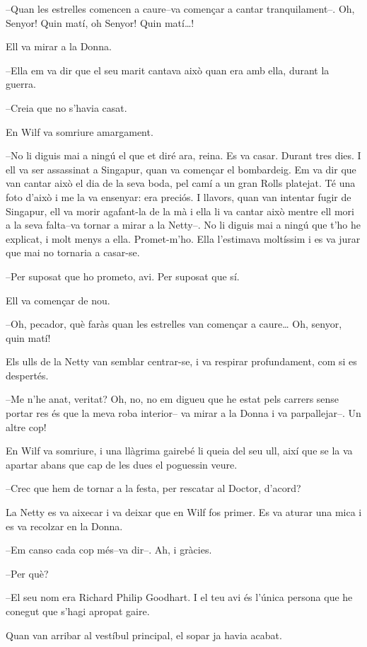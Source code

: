 --Quan les estrelles comencen a caure--va començar a cantar
tranquilament--. Oh, Senyor! Quin matí, oh Senyor! Quin matí\ldots{}!

Ell va mirar a la Donna.

--Ella em va dir que el seu marit cantava això quan era amb ella, durant
la guerra.

--Creia que no s'havia casat.

En Wilf va somriure amargament.

--No li diguis mai a ningú el que et diré ara, reina. Es va casar.
Durant tres dies. I ell va ser assassinat a Singapur, quan va començar
el bombardeig. Em va dir que van cantar això el dia de la seva boda, pel
camí a un gran Rolls platejat. Té una foto d'això i me la va ensenyar:
era preciós. I llavors, quan van intentar fugir de Singapur, ell va
morir agafant-la de la mà i ella li va cantar això mentre ell mori a la
seva falta--va tornar a mirar a la Netty--. No li diguis mai a ningú que
t'ho he explicat, i molt menys a ella. Promet-m'ho. Ella l'estimava
moltíssim i es va jurar que mai no tornaria a casar-se.

--Per suposat que ho prometo, avi. Per suposat que sí.

Ell va començar de nou.

--Oh, pecador, què faràs quan les estrelles van començar a caure\ldots{}
Oh, senyor, quin matí!

Els ulls de la Netty van semblar centrar-se, i va respirar profundament,
com si es despertés.

--Me n'he anat, veritat? Oh, no, no em digueu que he estat pels carrers
sense portar res és que la meva roba interior-- va mirar a la Donna i va
parpallejar--. Un altre cop!

En Wilf va somriure, i una llàgrima gairebé li queia del seu ull, així
que se la va apartar abans que cap de les dues el poguessin veure.

--Crec que hem de tornar a la festa, per rescatar al Doctor, d'acord?

La Netty es va aixecar i va deixar que en Wilf fos primer. Es va aturar
una mica i es va recolzar en la Donna.

--Em canso cada cop més--va dir--. Ah, i gràcies.

--Per què?

--El seu nom era Richard Philip Goodhart. I el teu avi és l'única
persona que he conegut que s'hagi apropat gaire.

Quan van arribar al vestíbul principal, el sopar ja havia acabat.

